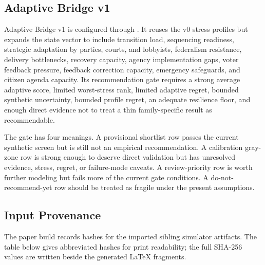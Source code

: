 \documentclass[11pt]{article}
\providecommand{\GeneratedDir}{generated}
\begin{document}






\subsection{Adaptive Bridge v1}

Adaptive Bridge v1 is configured through . It reuses the v0 stress profiles but expands the state vector to include transition load, sequencing readiness, strategic adaptation by parties, courts, and lobbyists, federalism resistance, delivery bottlenecks, recovery capacity, agency implementation gaps, voter feedback pressure, feedback correction capacity, emergency safeguards, and citizen agenda capacity. Its recommendation gate requires a strong average adaptive score, limited worst-stress rank, limited adaptive regret, bounded synthetic uncertainty, bounded profile regret, an adequate resilience floor, and enough direct evidence not to treat a thin family-specific result as recommendable.

The gate has four meanings. A provisional shortlist row passes the current synthetic screen but is still not an empirical recommendation. A calibration gray-zone row is strong enough to deserve direct validation but has unresolved evidence, stress, regret, or failure-mode caveats. A review-priority row is worth further modeling but fails more of the current gate conditions. A do-not-recommend-yet row should be treated as fragile under the present assumptions.







\subsection{Input Provenance}

The paper build records hashes for the imported sibling simulator artifacts. The table below gives abbreviated hashes for print readability; the full SHA-256 values are written beside the generated LaTeX fragments.


\end{document}
